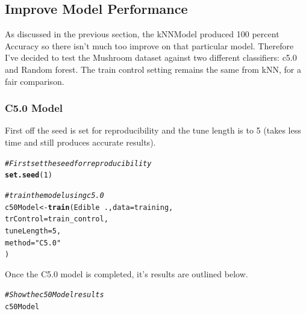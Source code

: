 \documentclass[10pt  ,usenames, dvipsnames]{article}\usepackage[]{graphicx}\usepackage[]{color}
\makeatletter
\newcommand{\hlnum}[1]{\textcolor[rgb]{0.686,0.059,0.569}{#1}}%
\newcommand{\hlstr}[1]{\textcolor[rgb]{0.192,0.494,0.8}{#1}}%
\newcommand{\hlcom}[1]{\textcolor[rgb]{0.678,0.584,0.686}{\textit{#1}}}%
\newcommand{\hlopt}[1]{\textcolor[rgb]{0,0,0}{#1}}%
\newcommand{\hlstd}[1]{\textcolor[rgb]{0.345,0.345,0.345}{#1}}%
\newcommand{\hlkwb}[1]{\textcolor[rgb]{0.69,0.353,0.396}{#1}}%
\newcommand{\hlkwc}[1]{\textcolor[rgb]{0.333,0.667,0.333}{#1}}%
\newcommand{\hlkwd}[1]{\textcolor[rgb]{0.737,0.353,0.396}{\textbf{#1}}}%
\newenvironment{kframe}{%
 \def\at@end@of@kframe{}%
 \ifinner\ifhmode%
  \def\at@end@of@kframe{\end{minipage}}%
  \begin{minipage}{\columnwidth}%
 \fi\fi%
 \def\FrameCommand##1{\hskip\@totalleftmargin \hskip-\fboxsep
 \colorbox{shadecolor}{##1}\hskip-\fboxsep
     \hskip-\linewidth \hskip-\@totalleftmargin \hskip\columnwidth}%
 \MakeFramed {\advance\hsize-\width
   \@totalleftmargin\z@ \linewidth\hsize
   \@setminipage}}%
 {\par\unskip\endMakeFramed%
 \at@end@of@kframe}
\newenvironment{knitrout}{}{} %
\makeatother
\begin{document}
\clearpage


\subsection{Improve Model Performance}

As discussed in the previous section, the kNNModel produced 100 percent Accuracy so there isn't much too improve on that particular model. Therefore I've decided to test the Mushroom dataset against two different classifiers: c5.0 and Random forest. The train control setting remains the same from kNN, for a fair comparison.

\subsubsection{C5.0 Model}

First off the seed is set for reproducibility and the tune length is to 5 (takes less time and still produces accurate results).
\begin{knitrout}
\color{fgcolor}\begin{kframe}
\begin{alltt}
\hlcom{#First set the seed for reproducibility}
\hlkwd{set.seed}\hlstd{(}\hlnum{1}\hlstd{)}

\hlcom{#train the model using c5.0}
\hlstd{c50Model}\hlkwb{<-} \hlkwd{train}\hlstd{(Edible}\hlopt{~}\hlstd{.,} \hlkwc{data}\hlstd{=training,}
                 \hlkwc{trControl}\hlstd{=train_control,}
                 \hlkwc{tuneLength}\hlstd{=}\hlnum{5}\hlstd{,}
                 \hlkwc{method}\hlstd{=}\hlstr{"C5.0"}
\hlstd{)}
\end{alltt}
\end{kframe}
\end{knitrout}




Once the C5.0 model is completed, it's results are outlined below.
\begin{knitrout}
\color{fgcolor}\begin{kframe}
\begin{alltt}
\hlcom{#Show the c50Model results}
 \hlstd{c50Model}
\end{alltt}
\end{kframe}
\end{knitrout}
\end{document}
